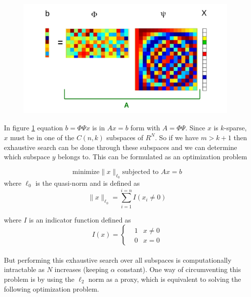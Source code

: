 \begin{figure}[!htbp]
  \begin{center}
      \includegraphics[height = 6cm, width=11cm]{figures/3}
    \label{Figci3}
  \end{center}
\end{figure}
In figure \ref{Figci3} equation $b = \Phi \Psi x$ is in $Ax = b$ form with $A = \Phi \Psi$.
Since $x$ is $k$-sparse, $x$ must be in one of the $C(n,k)$ subspaces of $R^N$. So if we have 
$m > k+1$ then exhaustive search can be done through these subspaces and we can determine which subspace $y$ belongs to.
This can be formulated as an optimization problem 

\begin{equation}
\mbox{minimize} \parallel x \parallel_{\ell_0} \mbox{subjected to }Ax=b
\label{1.2.1}
\end{equation}
where $\ell_0$ is the quasi-norm and is defined as 
\begin{equation}
 \parallel x \parallel_{\ell_0} =\displaystyle\sum\limits_{i=1}^{i=n}  I(x_i \neq 0) 
\label{1.2.2}
\end{equation}

where $I$ is an indicator function defined as 
\begin{equation}
I(x) =\left\lbrace
\begin{array}{lll}
  & 1 & x \neq 0\\
 & 0 & x = 0
\end{array}\right.
\label{1.2.3}
\end{equation}

\paragraph{}But performing this exhaustive search over all subspaces is computationally
intractable as $N$ increases (keeping $\alpha$ constant). One way of circumventing this problem is by using the $\ell_2$
norm as a proxy, which is equivalent to solving the following optimization problem. 

